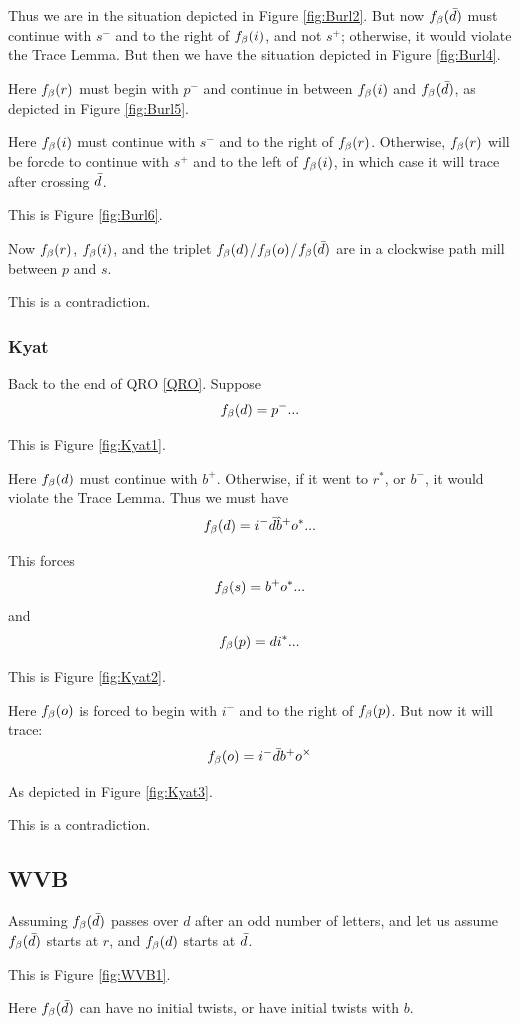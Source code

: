 Thus we are in the situation depicted in Figure \ref{fig:Burl2}. But now $f_\beta(\bar{d})$ must continue with $s^-$ and to the right of $f_\beta(i)$, and not $s^+$; otherwise, it would violate the Trace Lemma. But then we have the situation depicted in Figure \ref{fig:Burl4}.

Here $f_\beta(r)$ must begin with $p^-$ and continue in between $f_\beta(i)$ and $f_\beta(\bar{d})$, as depicted in Figure \ref{fig:Burl5}.

Here $f_\beta(i)$ must continue with $s^-$ and to the right of $f_\beta(r)$. Otherwise, $f_\beta(r)$ will be forcde to continue with $s^+$ and to the left of $f_\beta(i)$, in which case it will trace after crossing $\bar{d}$. 

This is Figure \ref{fig:Burl6}.

Now $f_\beta(r)$, $f_\beta(i)$, and the triplet $f_\beta(d)$/$f_\beta(o)$/$f_\beta(\bar{d})$ are in a clockwise path mill between $p$ and $s$.

This is a contradiction.

\subsubsection{Kyat}\label{Kyat}
Back to the end of QRO \ref{QRO}. Suppose
\[
f_\beta(d) = p^-...
\]

This is Figure \ref{fig:Kyat1}.

Here $f_\beta(d)$ must continue with $b^+$. Otherwise, if it went to $r^*$, or $b^-$, it would violate the Trace Lemma. Thus we must have
\[
f_\beta(d) = i^- \bar{d} \hat{b}^+ o^*...
\]

This forces 
\[
f_\beta(s) = b^+ o^*...
\]
and
\[
f_\beta(p) = d i^*...
\]

This is Figure \ref{fig:Kyat2}.

Here $f_\beta(o)$ is forced to begin with $i^-$ and to the right of $f_\beta(p)$. But now it will trace:
\[
f_\beta(o) = i^- \bar{d} b^+ o^\times 
\]

As depicted in Figure \ref{fig:Kyat3}.

This is a contradiction.


\subsection{WVB}\label{WVB}
Assuming $f_\beta(\bar{d})$ passes over $d$ after an odd number of letters, and let us assume $f_\beta(\bar{d})$ starts at $r$, and $f_\beta(d)$ starts at $\bar{d}$.

This is Figure \ref{fig:WVB1}.

Here $f_\beta(\bar{d})$ can have no initial twists, or have initial twists with $b$.

